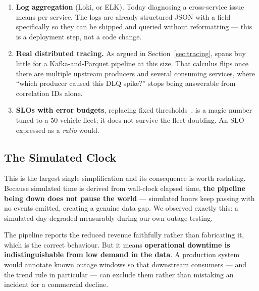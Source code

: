 \begin{enumerate}
  \item \textbf{Log aggregation} (Loki, or ELK). Today diagnosing a
        cross-service issue means  per service.
        The logs are already structured JSON with a  field
        specifically so they can be shipped and queried without
        reformatting --- this is a deployment step, not a code change.
  \item \textbf{Real distributed tracing.} As argued in
        Section~\ref{sec:tracing}, spans buy little for a
        Kafka-and-Parquet pipeline at this size. That calculus flips once
        there are multiple upstream producers and several consuming
        services, where ``which producer caused this DLQ spike?'' stops
        being answerable from correlation IDs alone.
  \item \textbf{SLOs with error budgets}, replacing fixed
        thresholds~\cite{beyer2016sre}.  is a
        magic number tuned to a 50-vehicle fleet; it does not survive the
        fleet doubling. An SLO expressed as a \emph{ratio} would.
\end{enumerate}

\subsection{The Simulated Clock}

This is the largest single simplification and its consequence is worth
restating. Because simulated time is derived from wall-clock elapsed
time, \textbf{the pipeline being down does not pause the world} ---
simulated hours keep passing with no events emitted, creating a genuine
data gap. We observed exactly this: a simulated day degraded measurably
during our own outage testing.

The pipeline reports the reduced revenue faithfully rather than
fabricating it, which is the correct behaviour. But it means
\textbf{operational downtime is indistinguishable from low demand in the
data}. A production system would annotate known outage windows so that
downstream consumers --- and the  trend rule
in particular --- can exclude them rather than mistaking an incident for a
commercial decline.
